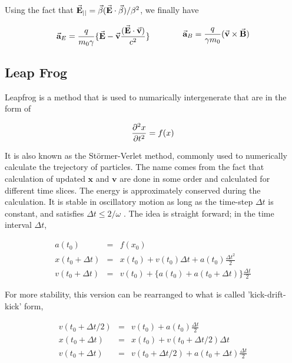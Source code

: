 \documentclass{article}
\begin{document}
Using the fact that $\vec{\textbf{E}}_{||} = \vec{\beta}(\vec{\textbf{E}} \cdot \vec{\beta})/\beta^2 $, we finally have

\begin{equation} \label{eq:acc_of_E_and_B}
    \begin{aligned}
        \vec{\textbf{a}}_{E} = \frac{q}{m_0 \gamma} \{ \vec{\textbf{E}} - \vec{\textbf{v}}\frac{(\vec{\textbf{E}} \cdot \vec{\textbf{v}})}{c^2} \}
    \end{aligned}
    \qquad \qquad
    \begin{aligned}
        \vec{\textbf{a}}_{B} = \frac{q}{\gamma m_0} ( \vec{\textbf{v}} \times \vec{\textbf{B}} )
    \end{aligned}
\end{equation}

\newpage
\subsection{Leap Frog}
Leapfrog is a method that is used to numarically intergenerate that are in the form of

\begin{equation*}
    \frac{\partial^2 x}{\partial t^2} = f(x)
\end{equation*}

It is also known as the Störmer-Verlet method, commonly used to numerically calculate the trejectory of particles. 
The name comes from the fact that calculation of updated $\textbf{x}$ and $\textbf{v}$ are done in some order and calculated for different time slices. 
The energy is approximately conserved during the calculation. 
It is stable in oscillatory motion as long as the time-step $\Delta t$ is constant, and satisfies $\Delta t\leq 2/\omega$ \cite{leapfrog_osc}.
The idea is straight forward; in the time interval $\Delta t$, 

\begin{eqnarray}
    a(t_0) &=& f(x_0) \nonumber \\
    x(t_0 + \Delta t) &=& x(t_0) + v(t_0)\Delta t + a(t_0)\frac{\Delta t^2}{2} \label{eq:leapfrog_sync_x}\\
    v(t_0 + \Delta t) &=& v(t_0) + \{ a(t_0) + a(t_0 + \Delta t)\}\frac{\Delta t}{2}  \label{eq:leapfrog_sync_v}
\end{eqnarray}

For more stability, this version can be rearranged to what is called 'kick-drift-kick' form,

\begin{eqnarray} \label{eq:leapfrog}
    v(t_0 + \Delta t/2) &=& v(t_0) +  a(t_0)\frac{\Delta t}{2} \nonumber \\
    x(t_0 + \Delta t) &=& x(t_0) + v(t_0 + \Delta t/2)\Delta t \\
    v(t_0 + \Delta t) &=& v(t_0 + \Delta t/2) + a(t_0 + \Delta t)\frac{\Delta t}{2}  \nonumber
\end{eqnarray}
\end{document}
